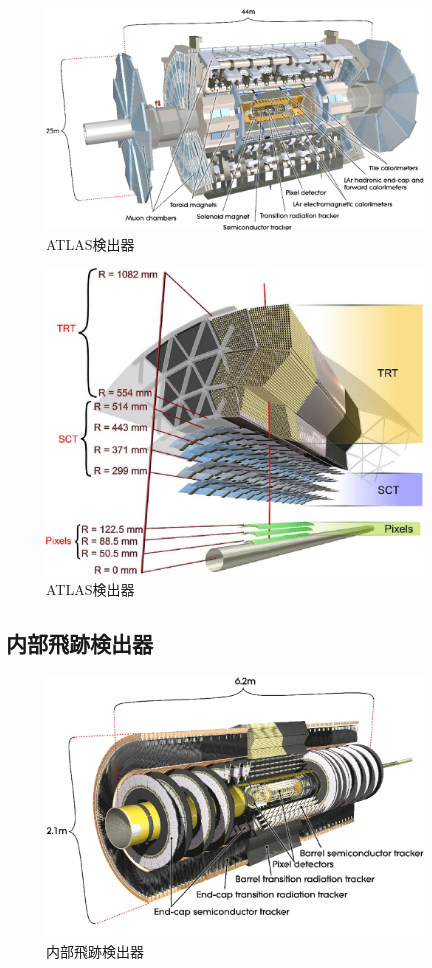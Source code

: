 \begin{figure}[bpt]\centering
\includegraphics[width=10cm]{atlas_detector}
\caption[ATLAS検出器]{ATLAS検出器\cite{1-2}}
\label{atlas_detector}
\end{figure}

\begin{figure}[bpt]\centering
\includegraphics[width=10cm]{atlas_detector_cross_section}
\caption[ATLAS検出器]{ATLAS検出器\cite{1-2}}
\label{atlas_detector_cross_section}
\end{figure}

\subsection{内部飛跡検出器}

\begin{figure}[bpt]\centering
\includegraphics[width=10cm]{inner_detector}
\caption[内部飛跡検出器]{内部飛跡検出器\cite{1-2}}
\label{inner_detector}
\end{figure}

